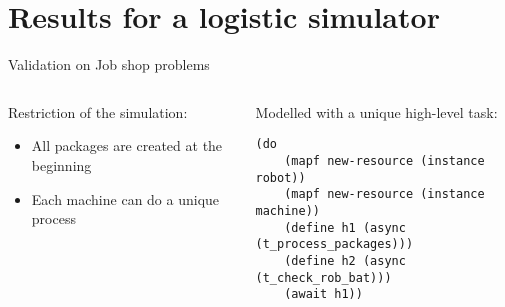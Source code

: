 \section{Results for a logistic simulator}

\begin{frame}[fragile]{Validation on Job shop problems}
\centering
\begin{columns}
    \begin{column}{0.5\textwidth}
        Restriction of the simulation:
        \begin{itemize}
            \item All packages are created at the beginning
            \item Each machine can do a unique process
        \end{itemize}
    \end{column}
    \begin{column}{0.5\textwidth}
        Modelled with a unique high-level task:
        \setlength{\leftmargini}{0pt}
    
        \tiny
    \begin{lstlisting}
(do
    (mapf new-resource (instance robot))
    (mapf new-resource (instance machine))
    (define h1 (async (t_process_packages)))
    (define h2 (async (t_check_rob_bat)))
    (await h1))
    \end{lstlisting}    
    \end{column}
    
\end{columns}
\end{frame}

\newcommand{\calcrowmean}{
    \def \rowmean{0}
    \pgfmathparse{\pgfkeysvalueof{/pgfplots/table/summary statistics/end index}-\pgfkeysvalueof{/pgfplots/table/summary statistics/start index}+1}
    \edef\numberofcols{\pgfmathresult}
    \pgfplotsforeachungrouped \col in {1,2,3,4,5,6,7,8,9,10}%
    {
        
        \typeout{col = \col}
        
        \pgfmathparse{\rowmean+\thisrowno{\col}/\numberofcols}
        \edef \rowmean{\pgfmathresult}
    }
}
\newcommand{\calcstddev}{
    \def\rowstddev{0}
    \calcrowmean
    \pgfplotsforeachungrouped \col in {1,2,3,4,5,6,7,8,9,10}
    {
        \pgfmathparse{\rowstddev+(\thisrowno{\col}-\rowmean)^2/(\numberofcols-1)}
        \edef\rowstddev{\pgfmathresult}
    }
    \pgfmathparse{sqrt(\rowstddev)}
}
\newcommand{\calcstderror}{
    \calcrowmean
    \calcstddev
    \pgfmathparse{sqrt(\rowstddev)/sqrt(\numberofcols)}
}

